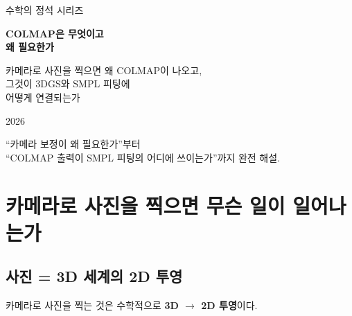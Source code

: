 \documentclass[11pt, a4paper]{report}
\theoremstyle{definition}
\theoremstyle{remark}
\begin{document}
\begin{titlepage}
\centering
\vspace*{1.5cm}
{\Large\color{gray} 수학의 정석 시리즈}
\vspace{0.5cm}

{\Huge\bfseries\color{defblue} COLMAP은 무엇이고\\[0.3cm]
왜 필요한가}

\vspace{0.8cm}

{\LARGE\color{defblue!70!black} 카메라로 사진을 찍으면 왜 COLMAP이 나오고,\\
그것이 3DGS와 SMPL 피팅에\\
어떻게 연결되는가}

\vspace{3cm}
{\large 2026}

\vspace{\fill}
{\small\color{gray} ``카메라 보정이 왜 필요한가''부터\\
``COLMAP 출력이 SMPL 피팅의 어디에 쓰이는가''까지 완전 해설.}
\end{titlepage}

\tableofcontents
\newpage


\chapter{카메라로 사진을 찍으면 무슨 일이 일어나는가}

\section{사진 = 3D 세계의 2D 투영}

카메라로 사진을 찍는 것은 수학적으로 \textbf{3D $\rightarrow$ 2D 투영}이다.
\end{document}
